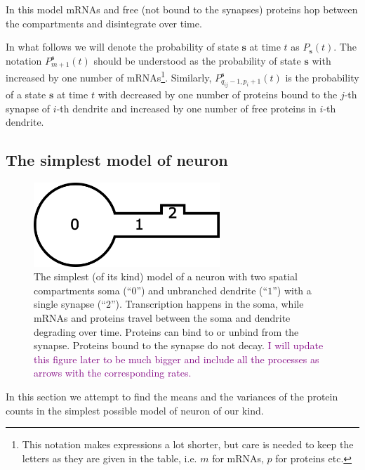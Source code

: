 \documentclass[a4paper, 11pt]{article}
\begin{document}
In this model mRNAs and free (not bound to the synapses) proteins hop between the compartments and disintegrate over time.

In what follows we will denote the probability of state $\mathbf s$ at time $t$ as $P_{\mathbf s}(t)$. The notation $P^{\mathbf s}_{m+1}(t)$ should be understood as the probability of state $\mathbf s$ with increased by one number of mRNAs\footnote{This notation makes expressions a lot shorter, but care is needed to keep the letters as they are given in the table, i.e. $m$ for mRNAs, $p$ for proteins etc.}. Similarly, $P^{\mathbf s}_{q_{ij}-1, p_i+1}(t)$ is the probability of a state $\mathbf s$ at time $t$ with decreased by one number of proteins bound to the $j$-th synapse of $i$-th dendrite and increased by one number of free proteins in $i$-th dendrite.


\subsection{The simplest model of neuron}
\begin{figure}
  \begin{center}
    \includegraphics[width=7cm]{img/simplest_neuron.png}
  \end{center}  
  \caption{The simplest (of its kind) model of a neuron with two spatial compartments soma (``$0$'') and unbranched dendrite (``$1$'') with a single synapse (``$2$''). Transcription happens in the soma, while mRNAs and proteins travel between the soma and dendrite degrading over time. Proteins can bind to or unbind from the synapse. Proteins bound to the synapse do not decay. \textcolor{purple}{I will update this figure later to be much bigger and include all the processes as arrows with the corresponding rates.}}
  \label{fig:simplest_neuron}
\end{figure}
In this section we attempt to find the means and the variances of the protein counts in the simplest possible model of neuron of our kind.
\end{document}
